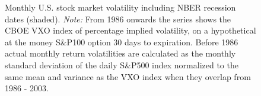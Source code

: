\documentclass[a4paper,11pt,listof=nochaptergap,oneside,pointednumbers,bibtotoc,bigheadings,liststotoc]{scrbook}
\theoremstyle{mysatz}
\theoremstyle{mydefinition}
\theoremstyle{mybemerkung}
\begin{document}
\begin{figure}[!ht]
   \centering
   \setlength\fboxsep{0pt}
   \setlength\fboxrule{0pt}
      \caption[Monthly U.S. stock market volatility including NBER recession dates.]{Monthly U.S. stock market volatility including NBER recession dates (shaded).
      \textit{Note:} From 1986 onwards the series shows the CBOE VXO index of percentage implied volatility, on a hypothetical at the money S\&P100 option 30 days to expiration. Before 1986 actual monthly return volatilities are calculated as the monthly standard deviation of the daily S\&P500 index normalized to the same mean and variance as the VXO index when they overlap from 1986 - 2003.}
   \label{fig:volatility}
\end{figure}



\end{document}
